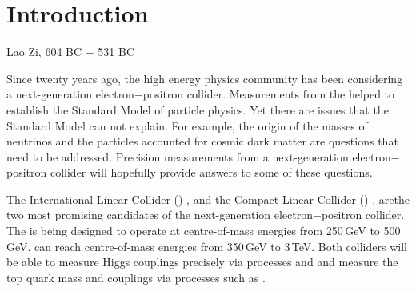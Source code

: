 \chapter{Introduction}
\label{chap:Introduction}



%
{Lao Zi, 604 BC $-$ 531 BC}%

Since twenty years ago, the high energy physics community has been considering a next-generation electron$-$positron collider. Measurements from the \LHC helped to establish the Standard Model of particle physics. Yet there are issues that the Standard Model can not explain. For example, the origin of the masses of neutrinos and the particles accounted for cosmic dark matter are questions that need to be addressed. Precision measurements from a next-generation electron$-$positron collider will hopefully provide answers to some of these questions.


The International Linear Collider (\ILC)  \cite{Brau:2007zza}, and the Compact Linear Collider (\CLIC) \cite{Linssen:2012hp}, arethe  two most promising candidates of the next-generation electron$-$positron collider. The \ILC is being designed to operate at centre-of-mass energies from 250\,GeV to 500\,GeV. \CLIC can reach centre-of-mass energies from 350\,GeV to 3\,TeV. Both colliders will be able to measure Higgs couplings precisely via processes  \HepProcess{\ee \to \PZ \PHiggs} and \HepProcess{\ee \to \PHiggs \Pneutrino \Pneutrino} and measure the top quark mass and couplings via processes such as \HepProcess{\ee \to \Ptop \APtop}.

